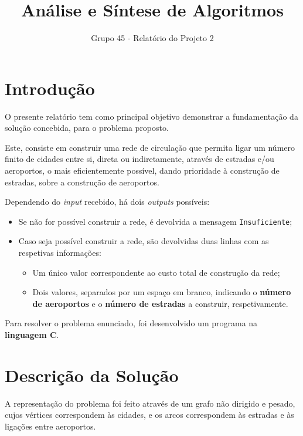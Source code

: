 \documentclass[12pt]{article}
\begin{document}
\title{\vspace{-3cm}Análise e Síntese de Algoritmos}
\author{Grupo 45 - Relatório do Projeto 2}
\date{}

\maketitle

\section*{Introdução}
O presente relatório tem como principal objetivo demonstrar a fundamentação da solução concebida, para o problema proposto.

Este, consiste em construir uma rede de circulação que permita ligar um número finito de cidades entre si, direta ou indiretamente, através de estradas e/ou aeroportos, o mais eficientemente possível, dando prioridade à construção de estradas, sobre a construção de aeroportos.

Dependendo do \textit{input} recebido, há dois \textit{outputs} possíveis:
	\begin{itemize}
		\item Se não for possível construir a rede, é devolvida a mensagem \texttt{Insuficiente};
		\item Caso seja possível construir a rede, são devolvidas duas linhas com as respetivas informações:
		\begin{itemize}
			\item Um único valor correspondente ao custo total de construção da rede;
			\item Dois valores, separados por um espaço em branco, indicando o \textbf{número de aeroportos} e o \textbf{número de estradas} a construir, respetivamente.
		\end{itemize}

	\end{itemize}
Para resolver o problema enunciado, foi desenvolvido um programa na \textbf{linguagem C}.

\section*{Descrição da Solução}
A representação do problema foi feito através de um grafo não dirigido e pesado, cujos vértices correspondem às cidades, e os arcos correspondem às estradas e às ligações entre aeroportos.
\end{document}
